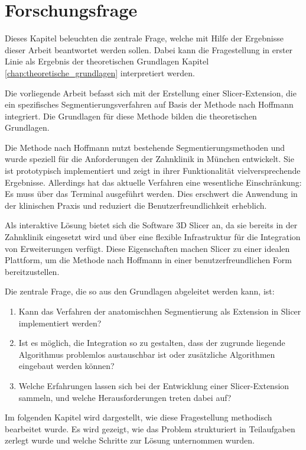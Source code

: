 \chapter{Forschungsfrage}
\label{chap:fragestellung} Dieses Kapitel beleuchten die zentrale Frage, welche
mit Hilfe der Ergebnisse dieser Arbeit beantwortet werden sollen. Dabei kann die
Fragestellung in erster Linie als Ergebnis der theoretischen Grundlagen Kapitel \ref{chap:theoretische_grundlagen}
interpretiert werden.

Die vorliegende Arbeit befasst sich mit der Erstellung einer Slicer-Extension,
die ein spezifisches Segmentierungsverfahren auf Basis der Methode nach Hoffmann
integriert. Die Grundlagen für diese Methode bilden die theoretischen Grundlagen.

Die Methode nach Hoffmann nutzt bestehende Segmentierungsmethoden und wurde speziell
für die Anforderungen der Zahnklinik in München entwickelt. Sie ist prototypisch
implementiert und zeigt in ihrer Funktionalität vielversprechende Ergebnisse. Allerdings
hat das aktuelle Verfahren eine wesentliche Einschränkung: Es muss über das
Terminal ausgeführt werden. Dies erschwert die Anwendung in der klinischen Praxis
und reduziert die Benutzerfreundlichkeit erheblich.

Als interaktive Lösung bietet sich die Software 3D Slicer an, da sie bereits in
der Zahnklinik eingesetzt wird und über eine flexible Infrastruktur für die
Integration von Erweiterungen verfügt. Diese Eigenschaften machen Slicer zu einer
idealen Plattform, um die Methode nach Hoffmann in einer benutzerfreundlichen
Form bereitzustellen.

Die zentrale Frage, die so aus den Grundlagen abgeleitet werden kann, ist:

\begin{enumerate}
	\item Kann das Verfahren der anatomischhen Segmentierung als Extension in Slicer
		implementiert werden?

	\item Ist es möglich, die Integration so zu gestalten, dass der zugrunde liegende
		Algorithmus problemlos austauschbar ist oder zusätzliche Algorithmen eingebaut
		werden können?

	\item Welche Erfahrungen lassen sich bei der Entwicklung einer Slicer-Extension
		sammeln, und welche Herausforderungen treten dabei auf?
\end{enumerate}

Im folgenden Kapitel wird dargestellt, wie diese Fragestellung methodisch
bearbeitet wurde. Es wird gezeigt, wie das Problem strukturiert in Teilaufgaben
zerlegt wurde und welche Schritte zur Lösung unternommen wurden.

